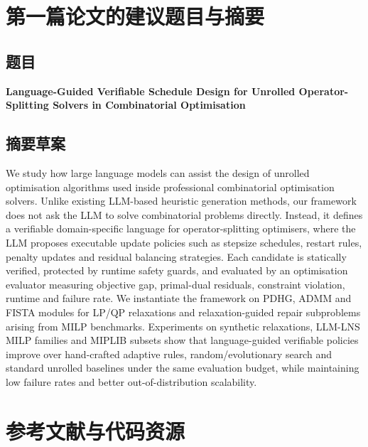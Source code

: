 \documentclass[12pt,a4paper]{ctexart}
\begin{document}
\section{第一篇论文的建议题目与摘要}

\subsection{题目}
\textbf{Language-Guided Verifiable Schedule Design for Unrolled Operator-Splitting Solvers in Combinatorial Optimisation}

\subsection{摘要草案}
We study how large language models can assist the design of unrolled optimisation algorithms used inside professional combinatorial optimisation solvers. Unlike existing LLM-based heuristic generation methods, our framework does not ask the LLM to solve combinatorial problems directly. Instead, it defines a verifiable domain-specific language for operator-splitting optimisers, where the LLM proposes executable update policies such as stepsize schedules, restart rules, penalty updates and residual balancing strategies. Each candidate is statically verified, protected by runtime safety guards, and evaluated by an optimisation evaluator measuring objective gap, primal-dual residuals, constraint violation, runtime and failure rate. We instantiate the framework on PDHG, ADMM and FISTA modules for LP/QP relaxations and relaxation-guided repair subproblems arising from MILP benchmarks. Experiments on synthetic relaxations, LLM-LNS MILP families and MIPLIB subsets show that language-guided verifiable policies improve over hand-crafted adaptive rules, random/evolutionary search and standard unrolled baselines under the same evaluation budget, while maintaining low failure rates and better out-of-distribution scalability.

\section{参考文献与代码资源}
\end{document}
